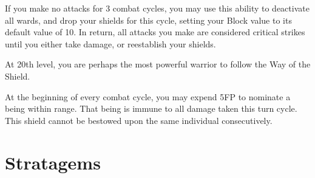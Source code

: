 {{	If you make no attacks for 3 combat cycles, you may use this ability to deactivate all wards, and drop your shields for this cycle, setting your Block value to its default value of 10. In return, all attacks you make are considered critical strikes until you either take damage, or re\minus{}establish your shields. 
}
{
	At 20th level, you are perhaps the most powerful warrior to follow the Way of the Shield. 
	
	At the beginning of every combat cycle, you may expend 5FP to nominate a being within range. That being is immune to all damage taken this turn cycle. This shield cannot be bestowed upon the same individual consecutively. 
}

\section*{Stratagems}

\newcommand\stratagem[3]
{
{\large \textbf{\textit{#1}}}: #2

Available to members of the {#3}. \\~\\ 
}

}
